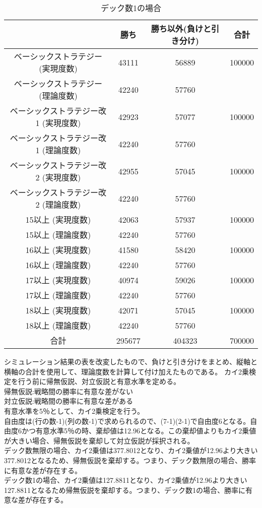 \begin{table}[H]
 \begin{center}
  \begin{tabular}{|c|c|c|c|}
    \hline
      & 勝ち & 勝ち以外(負けと引き分け) & 合計 \\
    \hline ベーシックストラテジー (実現度数)& 43111 & 56889 & 100000 \\
             ベーシックストラテジー (理論度数)& 42240 & 57760 &  \\
    \hline ベーシックストラテジー改1 (実現度数)& 42923 & 57077 & 100000 \\
             ベーシックストラテジー改1 (理論度数)& 42240 & 57760 &  \\
    \hline ベーシックストラテジー改2 (実現度数)& 42955 & 57045 & 100000 \\
              ベーシックストラテジー改2 (理論度数)& 42240 & 57760 &  \\
    \hline 15以上 (実現度数)& 42063 & 57937 & 100000 \\
             15以上 (理論度数)& 42240 & 57760 & 　\\
    \hline 16以上 (実現度数)& 41580 & 58420 & 100000 \\
             16以上 (理論度数)& 42240 & 57760 & 　\\
    \hline 17以上 (実現度数)& 40974 & 59026 & 100000 \\
             17以上 (理論度数)& 42240 & 57760 & 　\\
    \hline 18以上 (実現度数)& 42071 & 57045 & 100000 \\
             18以上 (理論度数)& 42240 & 57760 & 　\\
    \hline  合計 & 295677 & 404323 & 700000 \\
    \hline
  \end{tabular}
 \end{center}
 \caption{デック数1の場合}
\end{table}
\clearpage
シミュレーション結果の表を改変したもので、負けと引き分けをまとめ、縦軸と横軸の合計を使用して、理論度数を計算して付け加えたものである。
カイ2乗検定を行う前に帰無仮説、対立仮説と有意水準を定める。\\
帰無仮説:戦略間の勝率に有意な差がない\\
対立仮説:戦略間の勝率に有意な差がある\\
有意水準を5％として、カイ2乗検定を行う。\\
自由度は(行の数-1)(列の数-1)で求められるので、(7-1)(2-1)で自由度6となる。自由度6かつ有意水準5％の時、棄却値は12.96となる。この棄却値よりもカイ2乗値が大きい場合、帰無仮説を棄却して対立仮説が採択される。\\
デック数無限の場合、カイ2乗値は377.8012となり、カイ2乗値が12.96より大きい377.8012となるため、帰無仮説を棄却する。つまり、デック数無限の場合、勝率に有意な差が存在する。\\
デック数1の場合、カイ2乗値は127.8811となり、カイ2乗値が12.96より大きい127.8811となるため帰無仮説を棄却する。つまり、デック数1の場合、勝率に有意な差が存在する。
